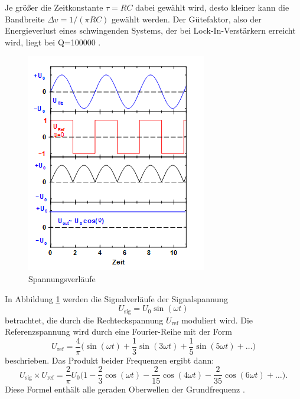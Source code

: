 Je größer die Zeitkonstante $\tau =RC$ dabei gewählt wird, desto kleiner kann die
Bandbreite $\Delta v=1/(\pi RC)$ gewählt werden.
Der Gütefaktor, also der Energieverlust eines schwingenden Systems,
der bei Lock-In-Verstärkern erreicht wird, liegt bei Q=100000
\cite{303}.
\newpage
\begin{figure}[h]
  \centering
  \includegraphics{Bilder/Spannung.jpg}
  \caption{Spannungsverläufe}
  \label{fig:spannung}
\end{figure}
In Abbildung \ref{fig:spannung} werden die Signalverläufe der Signalspannung
\begin{equation}
  U_\text{sig}=U_0\sin(\omega t)
\end{equation}
betrachtet, die durch die Rechteckspannung $U_\text{ref}$ moduliert wird.
Die Referenzspannung wird durch eine Fourier-Reihe mit der Form
\begin{equation}
  U_\text{ref}=\frac{4}{\pi}\biggl(\sin(\omega t)+\frac{1}{3}\sin(3\omega t)
  +\frac{1}{5}\sin(5\omega t)+\dots\biggr)
\end{equation}
beschrieben. Das Produkt beider Frequenzen ergibt dann:
\begin{equation}
  U_\text{sig}\times U_\text{ref} =\frac{2}{\pi}U_0\biggl(1-\frac{2}{3}\cos(\omega t)
  -\frac{2}{15}\cos(4\omega t)-\frac{2}{35}\cos(6\omega t)+\dots\biggr).
\end{equation}
Diese Formel enthält alle geraden Oberwellen der Grundfrequenz \omega.
